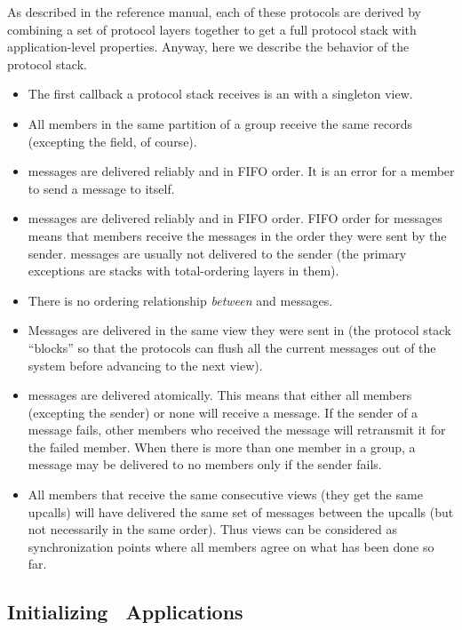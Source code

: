 As described in the reference manual, each of these protocols are derived by
combining a set of protocol layers together to get a full protocol stack with
application-level properties.  Anyway, here we describe the behavior of the
 protocol stack.
\begin{itemize}
\item
The first callback a protocol stack receives is an  with a
singleton view.
\item
All members in the same partition of a group receive the same 
records (excepting the  field, of course).
\item
{} messages are delivered reliably and in FIFO order.  It is an error
for a member to send a message to itself.
\item
{} messages are delivered reliably and in FIFO order.  FIFO order for
 messages means that members receive the messages in the order they
were sent by the sender.   messages are usually not delivered to
the sender (the primary exceptions are stacks with total-ordering layers in
them).
\item
There is no ordering relationship \emph{between}  and 
messages.
\item
Messages are delivered in the same view they were sent in (the protocol stack
``blocks'' so that the protocols can flush all the current messages out of the system
before advancing to the next view).
\item
{} messages are delivered atomically.  This means that either all
members (excepting the sender) or none will receive a  message.  If
the sender of a  message fails, other members who received the
message will retransmit it for the failed member.  When there is more than one
member in a group, a  message may be delivered to no members only
if the sender fails.
\item
All members that receive the same consecutive views (they get the same
 upcalls) will have delivered the same set of 
messages between the upcalls (but not necessarily in the same order).  Thus views can
be considered as synchronization points where all members agree on what has been done
so far.
\end{itemize}

\subsection{Initializing \ensemble\ Applications}

